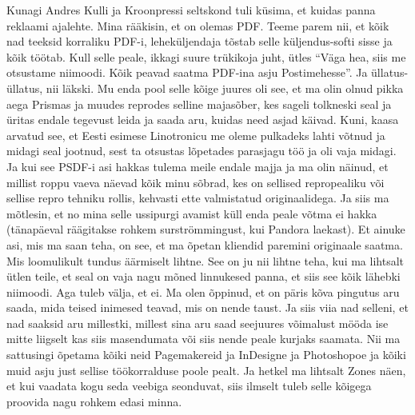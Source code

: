 Kunagi Andres Kulli ja Kroonpressi seltskond tuli küsima, et kuidas panna reklaami ajalehte. Mina rääkisin, et on olemas PDF. Teeme parem nii, et kõik nad teeksid korraliku PDF-i, leheküljendaja tõstab selle küljendus-softi sisse ja kõik töötab. Kull selle peale, ikkagi suure trükikoja juht, ütles \enquote{Väga hea, siis  me otsustame niimoodi. Kõik peavad saatma PDF-ina asju Postimehesse}. Ja üllatus-üllatus, nii läkski. Mu enda pool selle kõige juures oli see, et ma olin olnud pikka aega Prismas ja muudes reprodes selline majasõber, kes sageli tolkneski seal ja üritas endale tegevust leida ja saada aru, kuidas need asjad käivad. Kuni, kaasa arvatud see, et  Eesti esimese Linotronicu me oleme pulkadeks lahti võtnud ja midagi seal jootnud, sest ta  otsustas lõpetades parasjagu töö ja oli vaja midagi. Ja kui see PSDF-i asi hakkas tulema meile endale majja ja ma olin näinud, et millist roppu vaeva näevad kõik minu  sõbrad, kes on sellised repropealiku või  sellise repro tehniku rollis,  kehvasti ette valmistatud originaalidega. Ja siis ma mõtlesin, et no mina selle ussipurgi avamist küll enda peale võtma ei hakka (tänapäeval räägitakse rohkem surströmmingust, kui Pandora laekast). Et ainuke asi, mis ma saan teha, on see, et ma õpetan kliendid paremini originaale saatma. Mis loomulikult tundus äärmiselt lihtne. See on ju nii lihtne teha, kui ma lihtsalt ütlen teile, et seal on vaja nagu mõned linnukesed panna, et siis see kõik lähebki niimoodi. Aga tuleb välja, et ei. Ma olen õppinud, et on päris kõva pingutus aru saada,  mida teised inimesed teavad, mis on nende taust. Ja siis viia nad selleni, et nad saaksid aru millestki, millest sina aru saad seejuures võimalust mööda ise mitte liigselt kas siis masendumata või siis nende peale kurjaks saamata. Nii ma sattusingi õpetama  kõiki neid Pagemakereid ja InDesigne ja Photoshopoe ja kõiki muid asju just sellise töökorralduse poole pealt. Ja hetkel ma lihtsalt Zones näen, et kui vaadata kogu seda veebiga seonduvat, siis ilmselt tuleb selle kõigega proovida nagu rohkem edasi minna. 